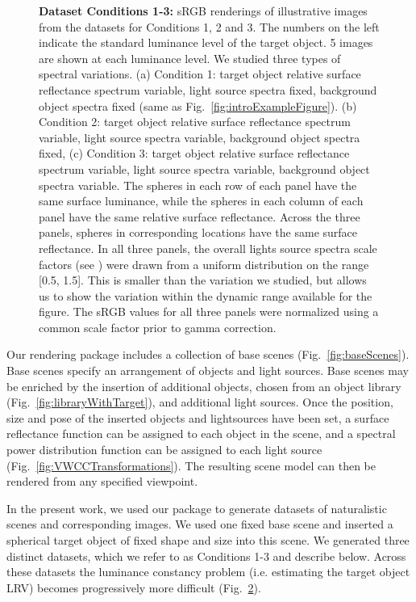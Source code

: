 \documentclass{jov}
\begin{document}
\begin{figure}
\begin{subfigure}[b]{0.33 \textwidth}
        \label{fig:allSpectraVarying}
    \end{subfigure}    
    \caption{{\bf Dataset Conditions 1-3:} sRGB renderings of illustrative images from the datasets for Conditions 1, 2 and 3. The numbers on the left indicate the standard luminance level of the target object. 5 images are shown at each luminance level. We studied three types of spectral variations. (a) Condition 1: target object relative surface reflectance spectrum variable, light source spectra fixed, background object spectra fixed (same as Fig.~\ref{fig:introExampleFigure}).
(b) Condition 2: target object relative surface reflectance spectrum variable, light source spectra variable, background object spectra fixed, (c) Condition 3: target object relative surface reflectance spectrum variable, light source spectra variable, background object spectra variable. The spheres in each row of each panel have the same surface luminance, while the spheres in each column of each panel have the same relative surface reflectance.  Across the three panels, spheres in corresponding locations have the same surface reflectance. In all three panels, the overall lights source spectra scale factors (see ) were drawn from a uniform distribution on the range [0.5, 1.5]. This is smaller than the variation we studied, but allows us to show the variation within the dynamic range available for the figure. The sRGB values for all three panels were normalized using a common scale factor prior to gamma correction.} 
\label{fig:studiedCases}
\end{figure}

Our rendering package includes a collection of base scenes (Fig.~\ref{fig:baseScenes}).
Base scenes specify an arrangement of objects and light sources.
Base scenes may be enriched by the insertion of additional objects, chosen from an object library (Fig.~\ref{fig:libraryWithTarget}), and additional light sources.
Once the position, size and pose of the inserted objects and lightsources have been set, 
a surface reflectance function can be assigned to each object in the scene, and a spectral power distribution function can be assigned to each light source (Fig.~\ref{fig:VWCCTransformations}). The resulting scene model can then be rendered from any specified viewpoint.

In the present work, we used our package to generate datasets of naturalistic scenes and corresponding images.
We used one fixed base scene and inserted a spherical target object of fixed shape and size into this scene.
We generated three distinct datasets, which we refer to as Conditions 1-3 and describe below.
Across these datasets the luminance constancy problem (i.e. estimating the target object LRV)
becomes progressively more difficult (Fig.~\ref{fig:studiedCases}).
\end{document}
